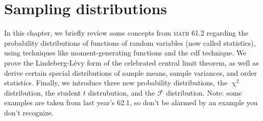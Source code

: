 \chapter{Sampling distributions}
In this chapter, we briefly review some concepts from \textsc{math} 61.2 regarding the probability distributions of functions of random variables (now called statistics), using techniques like moment-generating functions and the cdf technique. 
We prove the Lindeberg-L\'evy form of the celebrated central limit theorem, as well as derive certain special distributions of sample means, sample variances, and order statistics. 
Finally, we introduce three new probability distributions, the \(\upchi^2\) distribution, the student \(t\) distrubution, and the \(\mathscr{F}\) distribution. 
Note: some examples are taken from last year's 62.1, so don't be alarmed by an example you don't recognize. 
